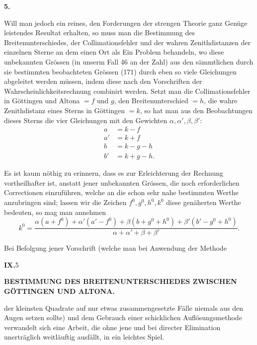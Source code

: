 \begin{center}\textbf{5.}\end{center}

Will man jedoch ein reines, den Forderungen der strengen Theorie ganz
Genüge leistendes Resultat erhalten, so muss man die Bestimmung des
Breitenunterschiedes, der Collimationsfehler und der wahren Zenithdistanzen der
einzelnen Sterne an dem einen Ort als Ein Problem behandeln, wo diese
unbekannten Grössen (in unserm Fall 46 an der Zahl) aus den sämmtlichen
durch sie bestimmten beobachteten Grössen (171) durch eben so viele
Gleichungen abgeleitet werden müssen, indem diese nach den Vorschriften der
Wahrscheinlichkeitsrechnung combinirt werden. Setzt man die Collimationsfehler
in Göttingen und Altona \(=f\) und \(g\), den Breitenunterschied \(=h\), die
wahre Zenithdistanz eines Sterns in Göttingen \(=k\), so hat man aus den
Beobachtungen dieses Sterns die vier Gleichungen mit den Gewichten \(\alpha,\alpha',\beta,\beta'\):
\[
\begin{aligned}
a&=k-f\\
a'&=k+f\\
b&=k-g-h\\
b'&=k+g-h.
\end{aligned}
\]

Es ist kaum nöthig zu erinnern, dass es zur Erleichterung der Rechnung
vortheilhafter ist, anstatt jener unbekannten Grössen, die noch erforderlichen
Correctionen einzuführen, welche an die schon sehr nahe bestimmten Werthe
anzubringen sind; lassen wir die Zeichen \(f^0,g^0,h^0,k^0\) diese genäherten Werthe
bedeuten, so mag man annehmen
\[
k^0=\frac{\alpha(a+f^0)+\alpha'(a'-f^0)+\beta(b+g^0+h^0)+\beta'(b'-g^0+h^0)}
{\alpha+\alpha'+\beta+\beta'}.
\]

Bei Befolgung jener Vorschrift (welche man bei Anwendung der Methode
\par\smallskip
\noindent\textbf{IX.}\hfill 5\hspace{.12\textwidth}\par

\par\clearpage
\noindent{}\parbox[t]{\dimexpr\linewidth-24mm\relax}{\centering\scriptsize\bfseries BESTIMMUNG DES BREITENUNTERSCHIEDES ZWISCHEN GÖTTINGEN UND ALTONA.}\makebox[12mm][r]{}\par\medskip

\noindent der kleinsten Quadrate auf nur etwas zusammengesetzte Fälle niemals aus
den Augen setzen sollte) und dem Gebrauch einer schicklichen 
Auflösungsmethode verwandelt sich eine Arbeit, die ohne jene und bei
directer Elimination unerträglich weitläuftig ausfällt, in ein leichtes Spiel.

